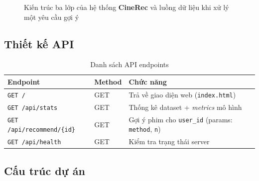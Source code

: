 \documentclass[../BTL.tex]{subfiles}
\begin{document}
\begin{figure}[H]
\caption{Kiến trúc ba lớp của hệ thống \textbf{CineRec} và luồng dữ liệu khi
xử lý một yêu cầu gợi ý}
\label{fig:architecture}
\end{figure}

\subsection{Thiết kế API}
\label{section:3.3.2}

\begin{table}[H]
    \centering
    \caption{Danh sách API endpoints}
    \label{tab:api}
    \begin{tabular}{llp{7cm}}
        \toprule
        \textbf{Endpoint} & \textbf{Method} & \textbf{Chức năng} \\
        \midrule
        \texttt{GET /}
            & GET & Trả về giao diện web (\texttt{index.html}) \\
        \texttt{GET /api/stats}
            & GET & Thống kê dataset + \textit{metrics} mô hình \\
        \texttt{GET /api/recommend/\{id\}}
            & GET & Gợi ý phim cho \texttt{user\_id}
                    (params: \texttt{method}, \texttt{n}) \\
        \texttt{GET /api/health}
            & GET & Kiểm tra trạng thái server \\
        \bottomrule
    \end{tabular}
\end{table}

\subsection{Cấu trúc dự án}
\label{section:3.3.3}
\end{document}
